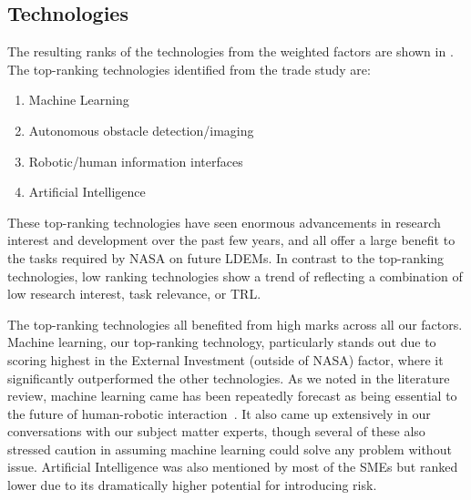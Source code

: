 \subsection{Technologies}
The resulting ranks of the technologies from the weighted factors are shown in .
The top-ranking technologies identified from the trade study are:
\begin{enumerate}
	\item Machine Learning
	\item Autonomous obstacle detection/imaging
	\item Robotic/human information interfaces
	\item Artificial Intelligence
\end{enumerate}

These top-ranking technologies have seen enormous advancements in research interest and development over the past few years, and all offer a large benefit to the tasks required by NASA on future LDEMs.
In contrast to the top-ranking technologies, low ranking technologies show a trend of reflecting a combination of low research interest, task relevance, or TRL.

The top-ranking technologies all benefited from high marks across all our factors.
Machine learning, our top-ranking technology, particularly stands out due to scoring highest in the External Investment (outside of NASA) factor, where it significantly outperformed the other technologies.
As we noted in the literature review, machine learning came has been repeatedly forecast as being essential to the future of human-robotic interaction~\citep{wang_current_2018}.
It also came up extensively in our conversations with our subject matter experts, though several of these also stressed caution in assuming machine learning could solve any problem without issue.
Artificial Intelligence was also mentioned by most of the SMEs but ranked lower due to its dramatically higher potential for introducing risk.

